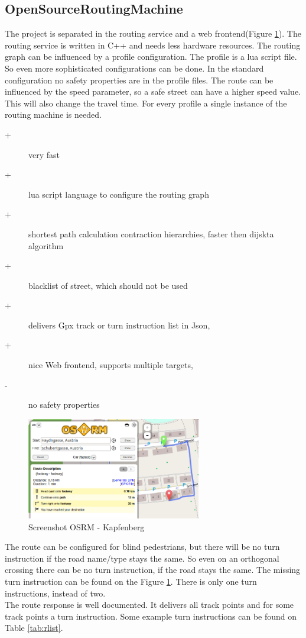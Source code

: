 \documentclass{sig-alternate}
\begin{document}



\subsection{OpenSourceRoutingMachine}
The project is separated in the routing service and a web frontend(Figure \ref{fig:osrm}). The routing service is written in C++ and needs less hardware resources. The routing graph can be influenced by a profile configuration. The profile is a lua script file. So even more sophisticated configurations can be done. In the standard configuration no safety properties are in the profile files. The route can be influenced by the speed parameter, so a safe street can have a higher speed value.  This will also change the travel time. For every profile a single instance of the routing machine is needed.  \\
\begin{description}
\item[+]very fast\cite{luxen-vetter-2011}
\item[+]lua script language to configure the routing graph 
\item[+]shortest path calculation contraction hierarchies, faster then dijskta algorithm
\item[+]blacklist of street, which should not be used
\item[+]delivers Gpx track or turn instruction list in Json,
\item[+]nice Web frontend, supports multiple targets,
\item[-]no safety properties
\end{description}

\begin{figure}
\centering
\includegraphics[width=3in]{osrm-ss.png}
\caption{Screenshot OSRM - Kapfenberg}
\label{fig:osrm}
\end{figure}

The route can be configured for blind pedestrians, but there will be no turn instruction if the road name/type stays the same. So even on an orthogonal crossing there can be no turn instruction, if the road stays the same. 
The missing turn instruction can be found on the Figure \ref{fig:osrm}. There is only one turn instructions, instead of two. \\
The route response is well documented. It delivers all track points and for some track points a turn instruction. Some example turn instructions can be found on Table \ref{tab:rlist}. \\ 
\end{document}
